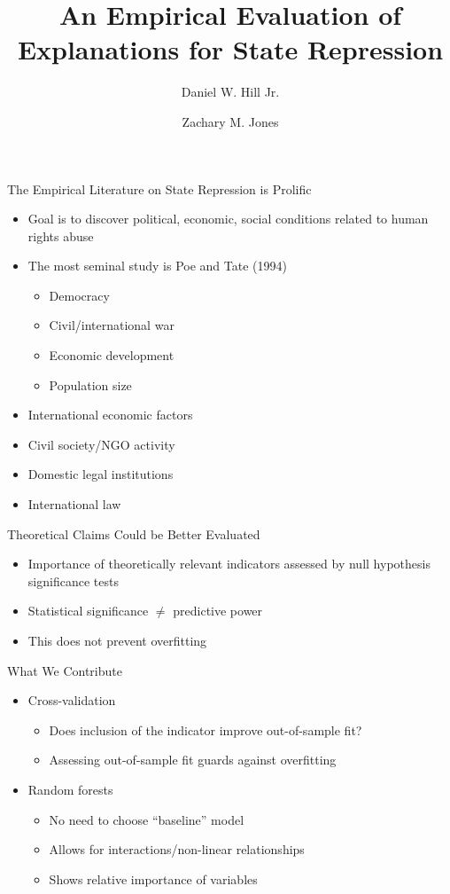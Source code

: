 \documentclass{beamer}
\title{An Empirical Evaluation of Explanations for State Repression}
\author[shortname]{Daniel W. Hill Jr. \inst{1} \and Zachary M. Jones \inst{2}}
\institute[shortinst]{\inst{1} University of Georgia \and %
  \inst{2} Penn State University}
\date{}
\begin{document}
\maketitle

\begin{frame}{The Empirical Literature on State Repression is Prolific}
  \begin{itemize}
  \item Goal is to discover political, economic, social conditions related to human rights abuse
  \item The most seminal study is Poe and Tate (1994)
    \begin{itemize}
    \item Democracy
    \item Civil/international war
    \item Economic development
    \item Population size
    \end{itemize}
  \item International economic factors
  \item Civil society/NGO activity
  \item Domestic legal institutions
  \item International law
  \end{itemize}
\end{frame}

\begin{frame}{Theoretical Claims Could be Better Evaluated}
  \begin{itemize}
  \item Importance of theoretically relevant indicators assessed by null hypothesis significance tests
  \item Statistical significance $\neq$ predictive power
  \item This does not prevent overfitting
  \end{itemize}
\end{frame}

\begin{frame}{What We Contribute}
  \begin{itemize}
  \item Cross-validation
    \begin{itemize}
    \item Does inclusion of the indicator improve out-of-sample fit? 
    \item Assessing out-of-sample fit guards against overfitting
    \end{itemize}
  \item Random forests
    \begin{itemize}
    \item No need to choose ``baseline'' model
    \item Allows for interactions/non-linear relationships
    \item Shows relative importance of variables
    \end{itemize}
  \end{itemize}
\end{frame}
\end{document}
